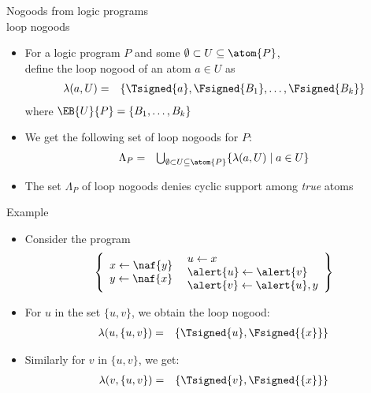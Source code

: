 \begin{frame}{Nogoods from logic programs\\[-1ex]\normalsize loop nogoods} %
  \begin{itemize}
  \item<1->
    For a logic program $P$ and some $\emptyset \subset U\subseteq\atom{P}$,\\
    define the \alert{loop nogood} of an atom $a\in U$ as
    \begin{eqnarray*}
      \lambda(a,U)
      & = &
      \{\Tsigned{a},\Fsigned{B_1},\dots,\Fsigned{B_k}\}
    \end{eqnarray*}
    where $\EB{U}{P}=\{B_1,\dots,B_k\}$
    \medskip
  \item<2->
    We get the following set of loop nogoods for $P$:
    \begin{eqnarray*}
      \Lambda_P
      & = &
      \textstyle
      \bigcup_{\emptyset\subset U\subseteq \atom{P}}
      \{
      \lambda(a,U)
      \mid
      a\in U
      \}
    \end{eqnarray*}
  \item<3->  The set $\Lambda_P$ of loop nogoods denies cyclic
    support among \emph{true} atoms
  \end{itemize}
\end{frame}
\begin{frame}{Example}
  \begin{itemize}
  \item<1-> Consider the program
    \[
    \left\{
      \begin{array}{l}
        x  \leftarrow  \naf{y}\\
        y  \leftarrow  \naf{x}
      \end{array}
      \
      \begin{array}{l}
        u  \leftarrow  x\\
        \alert{u}  \leftarrow  \alert{v}\\
        \alert{v}  \leftarrow  \alert{u}, y
      \end{array}
    \right\}
    \]
  \item<2-> For $u$ in the set $\{u,v\}$, we obtain the loop nogood:
    \begin{eqnarray*}
      \lambda(u,\{u,v\}) &=& \{\Tsigned{u},\Fsigned{\{x\}}\}
    \end{eqnarray*}
  \item<3-> [] Similarly for $v$ in $\{u,v\}$, we get:
    \begin{eqnarray*}
      \lambda(v,\{u,v\}) &=& \{\Tsigned{v},\Fsigned{\{x\}}\}
    \end{eqnarray*}
  \end{itemize}
\end{frame}
